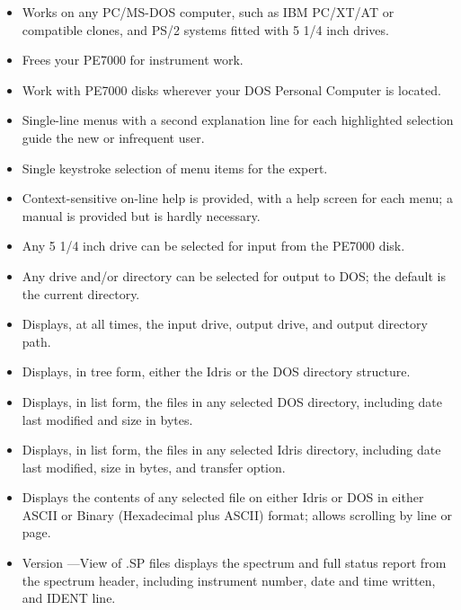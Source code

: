 \begin{itemize}
 
\item
Works on any PC/MS-DOS computer, such as IBM PC/XT/AT or compatible
clones, and PS/2 systems fitted with 5 1/4 inch drives.
 
\item
Frees your PE7000 for instrument work.
 
\item
Work with PE7000 disks wherever your DOS Personal Computer is
located.
 
\item
Single-line menus with a second explanation line for each highlighted
selection guide the new or infrequent user.
 
\item
Single keystroke selection of menu items for the expert.
 
\item
Context-sensitive on-line help is provided, with a help screen for 
each menu; a manual is provided but is hardly necessary.
 
\item
Any 5 1/4 inch drive can be selected for input from the PE7000 disk.
 
\item
Any drive and/or directory can be selected for output to DOS; the
default is the current directory.
 
\item
Displays, at all times, the input drive, output drive, and output
directory path.
 
\item
Displays, in tree form, either the Idris or the DOS directory
structure.
 
\item
Displays, in list form, the files in any selected DOS
directory, including date last modified and size in bytes.
 
\item
Displays, in list form, the files in any selected Idris
directory, including date last modified, size in bytes, and transfer
option.
 
\item
Displays the contents of any selected file on either Idris or DOS in
either ASCII or Binary (Hexadecimal plus ASCII) format; allows
scrolling by line or page.
 
\item
Version \SP---View of .SP files displays the spectrum and full status
report from the spectrum header, including instrument number, date
and time written, and IDENT line.
 
\end{itemize}


